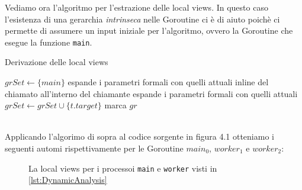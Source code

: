 Vediamo ora l'algoritmo per l'estrazione delle local views. In questo caso l'esistenza di una gerarchia \emph{intrinseca} nelle Goroutine ci è di aiuto poichè ci permette di assumere un input iniziale per l'algoritmo, ovvero la Goroutine che esegue la funzione \texttt{main}.
\begin{algorithm}
    \caption{Derivazione delle local views}
    \begin{algorithmic}
        \State $grSet \gets \{ main \}$
         
         
        \State espande i parametri formali con quelli attuali
        \State inline del chiamato all'interno del chiamante
        \State espande i parametri formali con quelli attuali
        \State $grSet \gets grSet \cup \{ t.target \}$
        \EndIf
        \EndFor
        \State marca $gr$
        \EndWhile
    \end{algorithmic}
\end{algorithm}\\
Applicando l'algorimo di sopra al codice sorgente in figura 4.1 otteniamo i seguenti automi rispettivamente per le Goroutine $main_0$, $worker_1$ e $worker_2$:
\begin{figure}[ht]
    \centering
    \caption{La local views per i processoi \texttt{main} e \texttt{worker} visti in \ref{lst:DynamicAnalysis}}
\end{figure}
\newpage %


